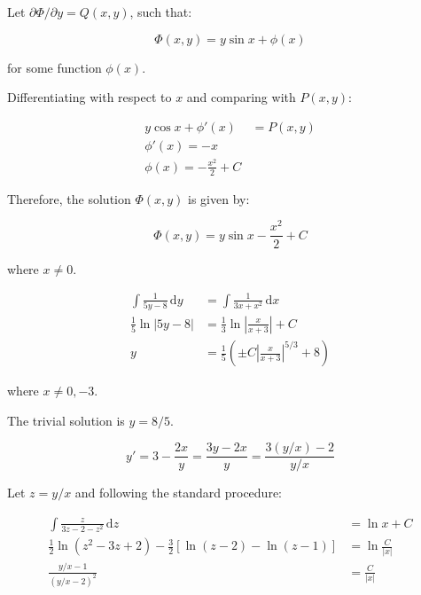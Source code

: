\documentclass[12pt]{article}
\begin{document}
Let $\partial \Phi/\partial y = Q(x, y)$, such that:

\begin{equation}
    \Phi(x, y) = y \sin{x} + \phi(x)
\end{equation}

for some function $\phi(x)$.

Differentiating with respect to $x$ and comparing with $P(x, y)$:

\begin{equation}
    \begin{split}
        y \cos{x} + \phi'(x) &= P(x, y) \\
        \phi'(x) = -x \\
        \phi(x) = -\frac{x^{2}}{2} + C
    \end{split}
\end{equation}

Therefore, the solution $\Phi(x, y)$ is given by:

\begin{equation}
    \Phi(x, y) = y \sin{x} - \frac{x^{2}}{2} + C
\end{equation}

where $x \ne 0$.


\begin{equation}
    \begin{split}
        \int \frac{1}{5y - 8} \, \mathrm{d}y &= \int \frac{1}{3x + x^{2}} \, \mathrm{d}x \\
        \frac{1}{5} \ln{\left\lvert 5y - 8 \right\rvert} &= \frac{1}{3} \ln{\left\lvert \frac{x}{x + 3} \right\rvert} + C \\
        y &= \frac{1}{5} \left( \pm C \left\lvert \frac{x}{x + 3} \right\rvert^{5/3} + 8 \right)
    \end{split}
\end{equation}

where $x \ne 0, -3$.

The trivial solution is $y = 8/5$.


\begin{equation}
    y' = 3 - \frac{2x}{y} = \frac{3y - 2x}{y} = \frac{3(y/x) - 2}{y/x}
\end{equation}

Let $z = y/x$ and following the standard procedure:

\begin{equation}
    \begin{split}
        \int \frac{z}{3z - 2 - z^{2}} \, \mathrm{d}z &= \ln{x} + C \\
        \frac{1}{2} \ln{(z^{2} - 3z + 2)} - \frac{3}{2} \left[ \ln{(z - 2)} - \ln{(z - 1)} \right] &= \ln{\frac{C}{\left\lvert x \right\rvert}} \\
        \frac{y/x - 1}{(y/x - 2)^{2}} &= \frac{C}{\left\lvert x \right\rvert}
    \end{split}
\end{equation}
\end{document}
